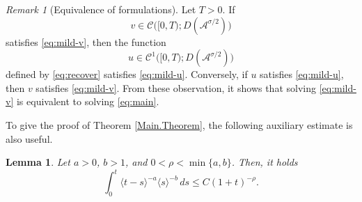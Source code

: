 \documentclass[a4paper,11pt]{article} %
\newtheorem{lemma}[theorem]{Lemma}
\theoremstyle{remark}
\newtheorem{remark}{Remark}[section]
\theoremstyle{definition}
\numberwithin{equation}{section}
\begin{document}
\begin{remark}[Equivalence of formulations]
\label{lem:equivalence}
Let \(T>0\). If
$$ v\in \mathcal{C}\Big([0,T);D(\mathcal{A}^{\sigma/2})\Big)$$
satisfies
\eqref{eq:mild-v},
then the function
$$u\in \mathcal{C}^1\Big([0,T);D(\mathcal{A}^{\sigma/2})\Big)$$
defined by
\eqref{eq:recover}
satisfies
\eqref{eq:mild-u}. Conversely, if \(u\) satisfies
\eqref{eq:mild-u}, then $v$ satisfies \eqref{eq:mild-v}. From these observation, it shows that solving \eqref{eq:mild-v} is equivalent to solving \eqref{eq:main}.
\end{remark}
To give the proof of Theorem \ref{Main.Theorem}, the following auxiliary estimate is also useful.
\begin{lemma} \label{lem:conv}
Let \(a>0\), \(b>1\), and \(0<\rho<\min\{a,b\}\). Then, it holds
\[
\int_0^t
\langle t-s\rangle^{-a}
\langle s\rangle^{-b}\,ds
\le
C(1+t)^{-\rho}.
\]
\end{lemma}
\end{document}
